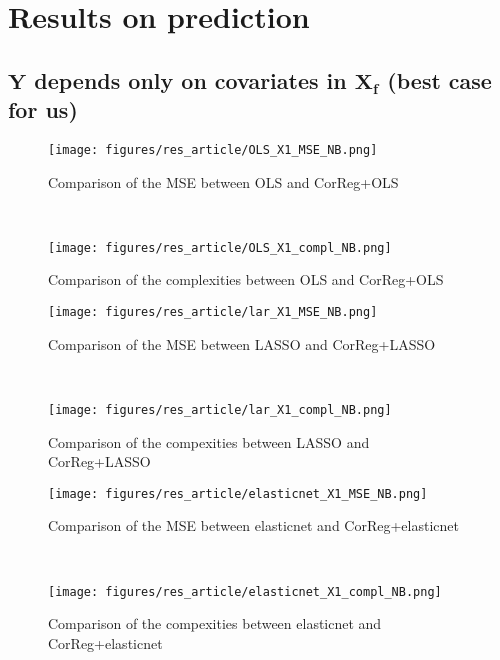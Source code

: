 \documentclass[12pt,a4paper]{report}
\begin{document}
\clearpage
\section{Results on prediction}\label{compY}

\subsection{$\boldsymbol{Y}$ depends only on covariates in $\boldsymbol{X_f}$ (best case for us)}	 \label{tableMSEsimgauche}
\begin{figure}[h!]
	\begin{minipage}[l]{.48\linewidth}
			\texttt{[image: figures/res\_article/OLS\_X1\_MSE\_NB.png]} 
			\caption{Comparison of the MSE between OLS and CorReg+OLS}
	\end{minipage} \
   \begin{minipage}[r]{.48\linewidth}
			\texttt{[image: figures/res\_article/OLS\_X1\_compl\_NB.png]} 
			\caption{Comparison of the complexities between OLS and CorReg+OLS} 
   \end{minipage}
\end{figure}
 

 \begin{figure}[h!]
	\begin{minipage}[l]{.48\linewidth}
			\texttt{[image: figures/res\_article/lar\_X1\_MSE\_NB.png]} 
			\caption{Comparison of the MSE between LASSO and CorReg+LASSO}
	\end{minipage} \
   \begin{minipage}[r]{.48\linewidth}
			\texttt{[image: figures/res\_article/lar\_X1\_compl\_NB.png]} 
			\caption{Comparison of the compexities between LASSO and CorReg+LASSO} 
   \end{minipage}
\end{figure}

 \begin{figure}[h!]
	\begin{minipage}[l]{.48\linewidth}
			\texttt{[image: figures/res\_article/elasticnet\_X1\_MSE\_NB.png]} 
			\caption{Comparison of the MSE between elasticnet and CorReg+elasticnet}
	\end{minipage} \
   \begin{minipage}[r]{.48\linewidth}
			\texttt{[image: figures/res\_article/elasticnet\_X1\_compl\_NB.png]} 
			\caption{Comparison of the compexities between elasticnet and CorReg+elasticnet} 
   \end{minipage}
\end{figure}
\end{document}
